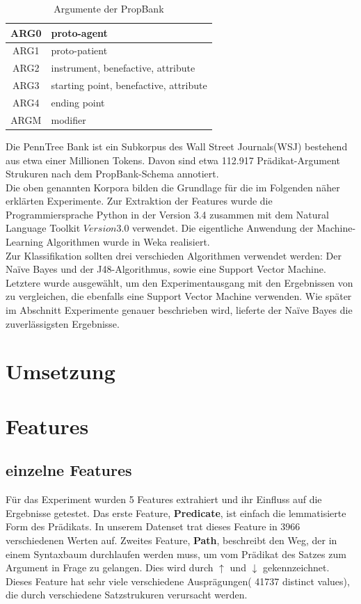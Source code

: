 \documentclass[]{article}
\begin{document}
\begin{table}
	\centering
	\begin{tabular}{|c|l|}
	\hline 
	ARG0 & proto-agent \\ 
	\hline 
	ARG1 & proto-patient \\ 
	\hline 
	ARG2 & instrument, benefactive, attribute \\ 
	\hline 
	ARG3 & starting point, benefactive, attribute \\ 
	\hline 
	ARG4 & ending point \\ 
	\hline 
	ARGM & modifier \\ 
	\hline 
	\end{tabular}
	\caption{Argumente der PropBank}
	\end{table}
	Die PennTree Bank \cite{Marcus93buildinga} ist ein Subkorpus des Wall Street Journals(WSJ) bestehend aus etwa einer Millionen Tokens. Davon sind etwa 112.917 Prädikat-Argument Strukuren nach dem PropBank-Schema annotiert. 
	\\
	Die oben genannten Korpora bilden die Grundlage für die im Folgenden näher erklärten Experimente.
	Zur Extraktion der Features wurde die Programmiersprache Python in der Version 3.4 zusammen mit dem Natural Language Toolkit \(Version 3.0\) verwendet. Die eigentliche Anwendung der Machine-Learning Algorithmen wurde in Weka \cite{Hall+FHPRW:2009} realisiert.
	\\
	Zur Klassifikation sollten drei verschieden Algorithmen verwendet werden:
	Der Naïve Bayes und der J48-Algorithmus, sowie eine Support
	Vector Machine. Letztere wurde ausgewählt, um den Experimentausgang mit den Ergebnissen von \cite{Pradhan05supportvector} zu vergleichen, die ebenfalls eine Support Vector Machine verwenden.
	Wie später im Abschnitt Experimente genauer beschrieben wird, lieferte der Naïve Bayes die zuverlässigsten Ergebnisse. 
	
	



\section{Umsetzung} 

\section{Features}
\subsection{einzelne Features}
Für das Experiment wurden 5 Features extrahiert und ihr Einfluss auf die Ergebnisse getestet. Das erste Feature, \textbf{Predicate}, ist einfach die lemmatisierte Form des Prädikats. In unserem Datenset trat dieses Feature in 3966 verschiedenen Werten auf. Zweites Feature, \textbf{Path}, beschreibt den Weg, der in einem Syntaxbaum durchlaufen werden muss, um vom Prädikat des Satzes zum Argument in Frage zu gelangen. Dies wird durch $\uparrow$ und $\downarrow$ gekennzeichnet. Dieses Feature hat sehr viele verschiedene Ausprägungen( 41737 distinct values), die durch verschiedene Satzstrukuren verursacht werden. 
\end{document}
